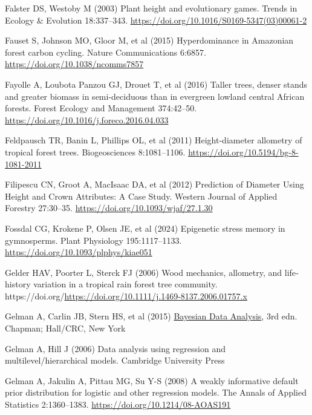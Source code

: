\documentclass[
  12pt,
  letterpaper,
  DIV=11,
  numbers=noendperiod]{scrartcl}
\newlength{\cslhangindent}
\newenvironment{CSLReferences}[2] %
 {\begin{list}{}{%
  \setlength{\itemindent}{0pt}
  \setlength{\leftmargin}{0pt}
  \setlength{\parsep}{0pt}
  \ifodd #1
   \setlength{\leftmargin}{\cslhangindent}
   \setlength{\itemindent}{-1\cslhangindent}
  \fi
  \setlength{\itemsep}{#2\baselineskip}}}
 {\end{list}}
\begin{document}
\begin{CSLReferences}{1}{1}
Falster DS, Westoby M (2003) Plant height and evolutionary games. Trends
in Ecology \& Evolution 18:337--343.
\url{https://doi.org/10.1016/S0169-5347(03)00061-2}

Fauset S, Johnson MO, Gloor M, et al (2015) Hyperdominance in
{Amazonian} forest carbon cycling. Nature Communications 6:6857.
\url{https://doi.org/10.1038/ncomms7857}

Fayolle A, Loubota Panzou GJ, Drouet T, et al (2016) Taller trees,
denser stands and greater biomass in semi-deciduous than in evergreen
lowland central {African} forests. Forest Ecology and Management
374:42--50. \url{https://doi.org/10.1016/j.foreco.2016.04.033}

Feldpausch TR, Banin L, Phillips OL, et al (2011) Height-diameter
allometry of tropical forest trees. Biogeosciences 8:1081--1106.
\url{https://doi.org/10.5194/bg-8-1081-2011}

Filipescu CN, Groot A, MacIsaac DA, et al (2012) Prediction of
{Diameter} {Using} {Height} and {Crown} {Attributes}: {A} {Case}
{Study}. Western Journal of Applied Forestry 27:30--35.
\url{https://doi.org/10.1093/wjaf/27.1.30}

Fossdal CG, Krokene P, Olsen JE, et al (2024) Epigenetic stress memory
in gymnosperms. Plant Physiology 195:1117--1133.
\url{https://doi.org/10.1093/plphys/kiae051}

Gelder HAV, Poorter L, Sterck FJ (2006) Wood mechanics, allometry, and
life‐history variation in a tropical rain forest tree community.
https://doi.org/\url{https://doi.org/10.1111/j.1469-8137.2006.01757.x}

Gelman A, Carlin JB, Stern HS, et al (2015)
\href{https://doi.org/10.1201/b16018}{Bayesian {Data} {Analysis}}, 3rd
edn. Chapman; Hall/CRC, New York

Gelman A, Hill J (2006) Data analysis using regression and
multilevel/hierarchical models. Cambridge University Press

Gelman A, Jakulin A, Pittau MG, Su Y-S (2008) A weakly informative
default prior distribution for logistic and other regression models. The
Annals of Applied Statistics 2:1360--1383.
\url{https://doi.org/10.1214/08-AOAS191}


\end{CSLReferences}
\end{document}
